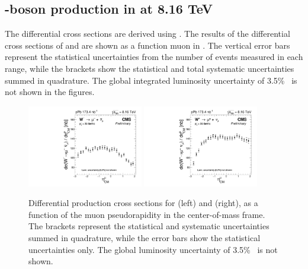 \subsection{\Wb-boson production in \RunpPb at 8.16 TeV} \label{sec:WBoson_Results_Observables}

The \WToMuNupm differential cross sections are derived using . The results of the differential cross sections of \WToMuNuPl and \WToMuNuMi are shown as a function muon \etaMuCM in . The vertical error bars represent the statistical uncertainties from the number of \WToMuNu events measured in each \etaMuCM range, while the brackets show the statistical and total systematic uncertainties summed in quadrature. The global integrated luminosity uncertainty of {3.5\%}~\cite{LUM-17-002} is not shown in the figures.

\begin{figure}[htb!]
 \centering
 \includegraphics[width=0.45\textwidth]{Figures/WBoson/Results/DATA/gr_WToMuMi_PA_Cross_Section_EffTnP_Nominal.pdf}
 \includegraphics[width=0.45\textwidth]{Figures/WBoson/Results/DATA/gr_WToMuPl_PA_Cross_Section_EffTnP_Nominal.pdf}
 \caption{Differential production cross sections for \WToMuNuPl (left) and \WToMuNuMi (right), as a function of the muon pseudorapidity in the center-of-mass frame. The brackets represent the statistical and systematic uncertainties summed in quadrature, while the error bars show the statistical uncertainties only. The global luminosity uncertainty of 3.5\%~\cite{LUM-17-002} is not shown. }
 \label{fig:CrossSection_WToMu_PA}
\end{figure}

